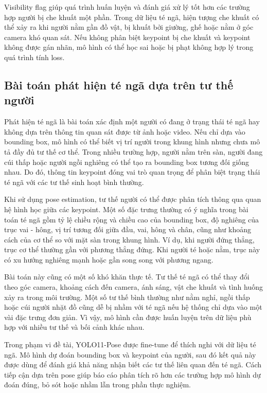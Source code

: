 \documentclass[12pt, a4paper]{article}
\begin{document}
Visibility flag giúp quá trình huấn luyện và đánh giá xử lý tốt hơn các trường hợp người bị che khuất một phần.
Trong dữ liệu té ngã, hiện tượng che khuất có thể xảy ra khi người nằm gần đồ vật, bị khuất bởi giường, ghế hoặc nằm ở góc camera khó quan sát.
Nếu không phân biệt keypoint bị che khuất và keypoint không được gán nhãn, mô hình có thể học sai hoặc bị phạt không hợp lý trong quá trình tính loss.

\subsection{Bài toán phát hiện té ngã dựa trên tư thế người}

Phát hiện té ngã là bài toán xác định một người có đang ở trạng thái té ngã hay không dựa trên thông tin quan sát được từ ảnh hoặc video.
Nếu chỉ dựa vào bounding box, mô hình có thể biết vị trí người trong khung hình nhưng chưa mô tả đầy đủ tư thế cơ thể.
Trong nhiều trường hợp, người nằm trên sàn, người đang cúi thấp hoặc người ngồi nghiêng có thể tạo ra bounding box tương đối giống nhau.
Do đó, thông tin keypoint đóng vai trò quan trọng để phân biệt trạng thái té ngã với các tư thế sinh hoạt bình thường.

Khi sử dụng pose estimation, tư thế người có thể được phân tích thông qua quan hệ hình học giữa các keypoint.
Một số đặc trưng thường có ý nghĩa trong bài toán té ngã gồm tỷ lệ chiều rộng và chiều cao của bounding box, độ nghiêng của trục vai - hông, vị trí tương đối giữa đầu, vai, hông và chân, cũng như khoảng cách của cơ thể so với mặt sàn trong khung hình.
Ví dụ, khi người đứng thẳng, trục cơ thể thường gần với phương thẳng đứng.
Khi người té hoặc nằm, trục này có xu hướng nghiêng mạnh hoặc gần song song với phương ngang.

Bài toán này cũng có một số khó khăn thực tế.
Tư thế té ngã có thể thay đổi theo góc camera, khoảng cách đến camera, ánh sáng, vật che khuất và tình huống xảy ra trong môi trường.
Một số tư thế bình thường như nằm nghỉ, ngồi thấp hoặc cúi người nhặt đồ cũng dễ bị nhầm với té ngã nếu hệ thống chỉ dựa vào một vài đặc trưng đơn giản.
Vì vậy, mô hình cần được huấn luyện trên dữ liệu phù hợp với nhiều tư thế và bối cảnh khác nhau.

Trong phạm vi đề tài, YOLO11-Pose được fine-tune để thích nghi với dữ liệu té ngã.
Mô hình dự đoán bounding box và keypoint của người, sau đó kết quả này được dùng để đánh giá khả năng nhận biết các tư thế liên quan đến té ngã.
Cách tiếp cận dựa trên pose giúp báo cáo phân tích rõ hơn các trường hợp mô hình dự đoán đúng, bỏ sót hoặc nhầm lẫn trong phần thực nghiệm.
\end{document}
